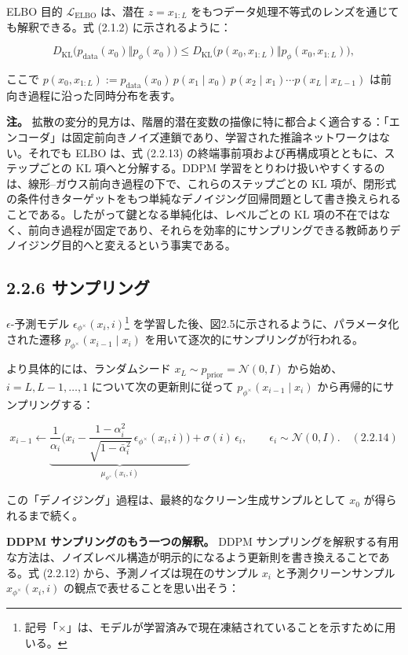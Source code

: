 ELBO 目的 $\mathcal{L}_{\mathrm{ELBO}}$ は、潜在 $z=x_{1:L}$ をもつデータ処理不等式のレンズを通じても解釈できる。式 (2.1.2) に示されるように：

\[
D_{\mathrm{KL}}\bigl(p_{\mathrm{data}}(x_0)\Vert p_\phi(x_0)\bigr) \le D_{\mathrm{KL}}\bigl(p(x_0,x_{1:L})\Vert p_\phi(x_0,x_{1:L})\bigr),
\]


ここで $p(x_0,x_{1:L}):=p_{\mathrm{data}}(x_0)\,p(x_1\mid x_0)\,p(x_2\mid x_1)\cdots p(x_L\mid x_{L-1})$ は前向き過程に沿った同時分布を表す。

\textbf{注。}
拡散の変分的見方は、階層的潜在変数の描像に特に都合よく適合する：「エンコーダ」は固定前向きノイズ連鎖であり、学習された推論ネットワークはない。それでも ELBO は、式 (2.2.13) の終端事前項および再構成項とともに、ステップごとの KL 項へと分解する。DDPM 学習をとりわけ扱いやすくするのは、線形–ガウス前向き過程の下で、これらのステップごとの KL 項が、閉形式の条件付きターゲットをもつ単純なデノイジング回帰問題として書き換えられることである。したがって鍵となる単純化は、レベルごとの KL 項の不在ではなく、前向き過程が固定であり、それらを効率的にサンプリングできる教師ありデノイジング目的へと変えるという事実である。

\subsection*{2.2.6 サンプリング}


$\epsilon$-予測モデル $\epsilon_{\phi^\times}(x_i,i)$\footnote{記号「$\times$」は、モデルが学習済みで現在凍結されていることを示すために用いる。} を学習した後、図2.5に示されるように、パラメータ化された遷移 $p_{\phi^\times}(x_{i-1}\mid x_i)$ を用いて逐次的にサンプリングが行われる。

より具体的には、ランダムシード $x_L\sim p_{\mathrm{prior}}=\mathcal{N}(0,I)$ から始め、$i=L,L-1,\ldots,1$ について次の更新則に従って $p_{\phi^\times}(x_{i-1}\mid x_i)$ から再帰的にサンプリングする：

\[
x_{i-1} \leftarrow \underbrace{\frac{1}{\alpha_i}\Biggl(x_i - \frac{1-\alpha_i^2}{\sqrt{1-\bar{\alpha}_i^2}}\,\epsilon_{\phi^\times}(x_i,i)\Biggr)}_{\mu_{\phi^\times}(x_i,i)} + \sigma(i)\,\epsilon_i, \qquad \epsilon_i\sim\mathcal{N}(0,I). \quad (2.2.14)
\]


この「デノイジング」過程は、最終的なクリーン生成サンプルとして $x_0$ が得られるまで続く。


\textbf{DDPM サンプリングのもう一つの解釈。} DDPM サンプリングを解釈する有用な方法は、ノイズレベル構造が明示的になるよう更新則を書き換えることである。式 (2.2.12) から、予測ノイズは現在のサンプル $x_i$ と予測クリーンサンプル $x_{\phi^\times}(x_i,i)$ の観点で表せることを思い出そう：

